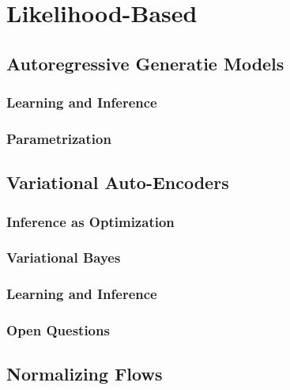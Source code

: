 	\section{Likelihood-Based} %

		\subsection{Autoregressive Generatie Models} %

			\subsubsection{Learning and Inference} %

			\subsubsection{Parametrization} %

		\subsection{Variational Auto-Encoders} %

			\subsubsection{Inference as Optimization} %

			\subsubsection{Variational Bayes} %

			\subsubsection{Learning and Inference} %

			\subsubsection{Open Questions} %

		\subsection{Normalizing Flows} %

